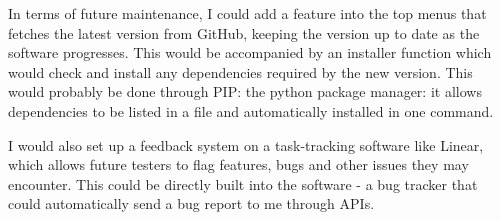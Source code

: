 In terms of future maintenance, I could add a feature into the top menus that fetches the latest version from GitHub, keeping the version up to date as the software progresses. This would be accompanied by an installer function which would check and install any dependencies required by the new version. This would probably be done through PIP: the python package manager: it allows dependencies to be listed in a file and automatically installed in one command.

I would also set up a feedback system on a task-tracking software like Linear, which allows future testers to flag features, bugs and other issues they may encounter. This could be directly built into the software - a bug tracker that could automatically send a bug report to me through APIs.